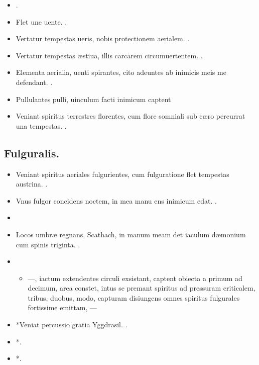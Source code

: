 \documentclass[12pt]{book}
\newcommand{\reconst}{*}
\begin{document}
\begin{itemize}
  \item {}.
  \item Flet une uente. .
  \item Vertatur tempestas ueris, nobis protectionem aerialem. .
  \item Vertatur tempestas æstiua, illis carcarem circumuertentem. .
  \item Elementa aerialia, uenti spirantes, cito adeuntes ab inimicis meis me defendant. .
  \item Pullulantes pulli, uinculum facti inimicum captent \textelp{}
  \item Veniant spiritus terrestres florentes,
        cum flore somniali sub cæro percurrat una tempestas.
        .
\end{itemize}

\subsection{Fulguralis.}\label{fulguralis}

\begin{itemize}
  \item Veniant spiritus aeriales fulgurientes,
        cum fulguratione flet tempestas austrina.
        .
  \item Vnus fulgor concidens noctem, in mea manu ens inimicum edat. .
  \item {}
  \item Locos umbræ regnans, Scathach,
        in manum meam det iaculum dæmonium cum spinis triginta. .
  \item {}
  \begin{itemize}
    \item ---, iactum extendentes circuli exsistant,
          captent obiecta a primum ad decimum, area constet,
          intus se premant spiritus ad pressuram criticalem,
          tribus, duobus, modo,
          capturam disiungens omnes spiritus fulgurales fortissime emittam,
          ---
  \end{itemize}
  \item \reconst{}Veniat percussio gratia Yggdrasil.
        .
  \item \reconst{}. %
  \item \reconst{}. %
\end{itemize}
\end{document}
